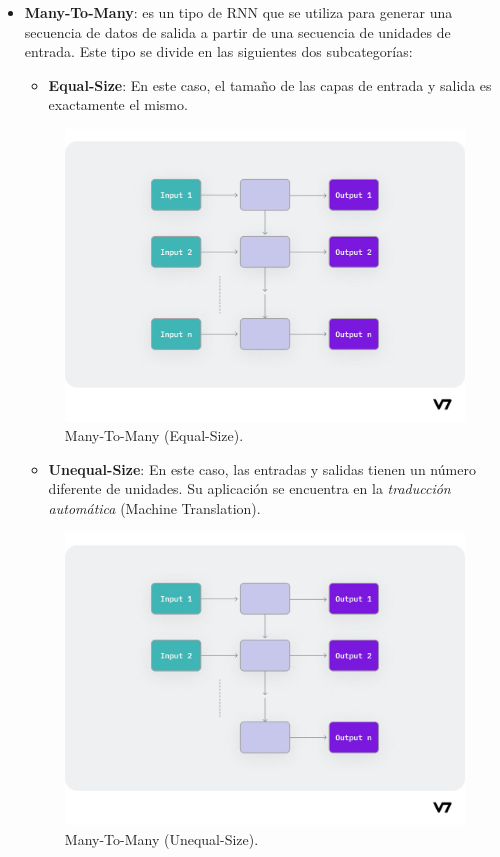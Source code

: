 \documentclass{article}
\begin{document}
\begin{itemize}
    \item \textbf{Many-To-Many}: es un tipo de RNN que se utiliza para generar una secuencia de datos de salida a partir de una secuencia de unidades de entrada. Este tipo se divide en las siguientes dos subcategorías:
    \begin{itemize}
        \item \textbf{Equal-Size}: En este caso, el tamaño de las capas de entrada y salida es exactamente el mismo.
    \end{itemize}
    \begin{figure}[H]
        \centering
        \includegraphics[scale=0.25]{mteq.png}
        \caption{Many-To-Many (Equal-Size).}
    \end{figure}
    \begin{itemize}
        \item \textbf{Unequal-Size}: En este caso, las entradas y salidas tienen un número diferente de unidades. Su aplicación se encuentra en la \textit{traducción automática} (Machine Translation).
    \end{itemize}
    \begin{figure}[H]
        \centering
        \includegraphics[scale=0.25]{mtun.png}
        \caption{Many-To-Many (Unequal-Size).}
    \end{figure}
\end{itemize}
\end{document}
